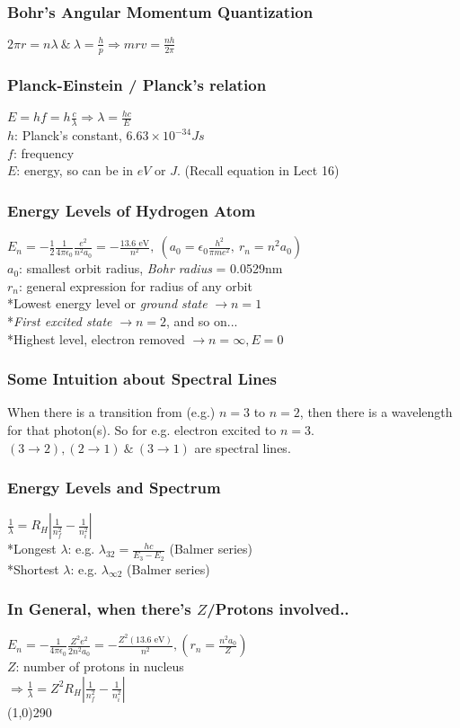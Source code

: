 \documentclass[10 pt]{article}
\begin{document}
\begin{multicols}{2}
\subsubsection*{Bohr's Angular Momentum Quantization}
$2 \pi r = n\lambda ~\&~ \lambda = \frac{h}{p} \Rightarrow mrv = \frac{nh}{2 \pi}$
\subsubsection*{Planck-Einstein / Planck's relation}
$E = hf = h \frac{c}{\lambda} \Rightarrow \lambda = \frac{hc}{E}$ \\
$h$: Planck's constant, $6.63 \times 10^{-34} J s$ \\
$f$: frequency \\
$E$: energy, so can be in $eV$ or $J$. (Recall equation in Lect 16)
\subsubsection*{Energy Levels of Hydrogen Atom}
$E_n = - \frac{1}{2} \frac{1}{4 \pi \epsilon_0} \frac{e^2}{n^2 a_0} = - \frac{13.6 \textrm{ eV}}{n^2}, ~(a_0 = \epsilon_0 \frac{h^2}{\pi m e^2}, ~r_n = n^2 a_0)$ \\
$a_0$: smallest orbit radius, \textit{Bohr radius} = 0.0529nm \\
$r_n$: general expression for radius of any orbit \\
*Lowest energy level or \textit{ground state} $\rightarrow n=1$ \\
*\textit{First excited state} $\rightarrow n=2$, and so on... \\
*Highest level, electron removed $\rightarrow n=\infty, E=0$
\subsubsection*{Some Intuition about Spectral Lines}
When there is a transition from (e.g.) $n=3$ to $n=2$, then there is a wavelength for that photon(s). So for e.g. electron excited to $n=3$. $(3\rightarrow 2), (2\rightarrow 1) ~\& ~ (3\rightarrow 1)$ are spectral lines.
\subsubsection*{Energy Levels and Spectrum}
$\frac{1}{\lambda} = R_H |\frac{1}{n_f^2} - \frac{1}{n_i^2}|$ \\
*Longest $\lambda$: e.g. $\lambda_{32} = \frac{hc}{E_3 - E_2}$ (Balmer series) \\
*Shortest $\lambda$: e.g. $\lambda_{\infty 2}$ (Balmer series)
\subsubsection*{In General, when there's $Z$/Protons involved..}
$E_n = - \frac{1}{4 \pi \epsilon_0} \frac{Z^2 e^2}{2n^2 a_0} = - \frac{Z^2 (13.6 \textrm{ eV})}{n^2}, (r_n = \frac{n^2 a_0}{Z})$ \\
$Z$: number of protons in nucleus \\
$\Rightarrow \frac{1}{\lambda} = Z^2 R_H |\frac{1}{n_f^2} - \frac{1}{n_i^2}|$ \\
\line(1,0){290}
\end{multicols}
\end{document}
